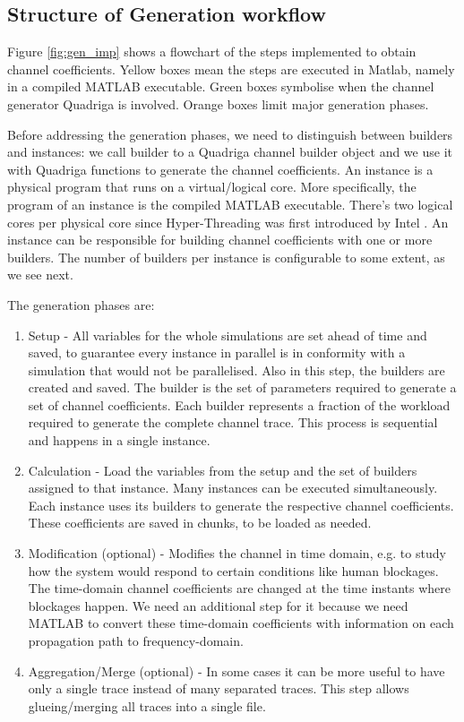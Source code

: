 \subsection{Structure of Generation workflow}

Figure \ref{fig:gen_imp} shows a flowchart of the steps implemented to obtain channel coefficients. Yellow boxes mean the steps are executed in Matlab, namely in a compiled MATLAB executable. Green boxes symbolise when the channel generator Quadriga is involved. Orange boxes limit major generation phases.

\pagebreak
{}
\pagebreak

Before addressing the generation phases, we need to distinguish between builders and instances: we call builder to a Quadriga channel builder object and we use it with Quadriga functions to generate the channel coefficients. An instance is a physical program that runs on a virtual/logical core. More specifically, the program of an instance is the compiled MATLAB executable. There's two logical cores per physical core since Hyper-Threading was first introduced by Intel \cite{wiki:hyperthreading}. An instance can be responsible for building channel coefficients with one or more builders. The number of builders per instance is configurable to some extent, as we see next. 

The generation phases are:

\begin{enumerate}
    \item Setup - All variables for the whole simulations are set ahead of time and saved, to guarantee every instance in parallel is in conformity with a simulation that would not be parallelised. Also in this step, the builders are created and saved. The builder is the set of parameters required to generate a set of channel coefficients. Each builder represents a fraction of the workload required to generate the complete channel trace. This process is sequential and happens in a single instance.
    \item Calculation - Load the variables from the setup and the set of builders assigned to that instance. Many instances can be executed simultaneously. Each instance uses its builders to generate the respective channel coefficients. These coefficients are saved in chunks, to be loaded as needed.
    \item Modification (optional) - Modifies the channel in time domain, e.g. to study how the system would respond to certain conditions like human blockages. The time-domain channel coefficients are changed at the time instants where blockages happen. We need an additional step for it because we need MATLAB to convert these time-domain coefficients with information on each propagation path to frequency-domain.
    \item Aggregation/Merge (optional) - In some cases it can be more useful to have only a single trace instead of many separated traces. This step allows glueing/merging all traces into a single file. 
\end{enumerate}


